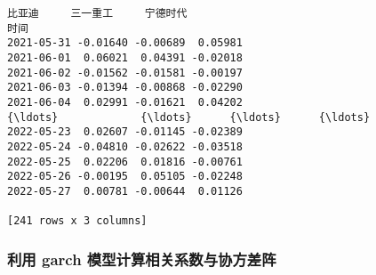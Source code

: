 \documentclass[11pt]{article}
\makeatletter
\newcommand{\boxspacing}{\kern\kvtcb@left@rule\kern\kvtcb@boxsep}
\newcommand{\prompt}[4]{
        {\ttfamily\llap{{\color{#2}[#3]:\hspace{3pt}#4}}\vspace{-\baselineskip}}
    }
\makeatother
\begin{document}
            \begin{tcolorbox}[breakable, size=fbox, boxrule=.5pt, pad at break*=1mm, opacityfill=0]
\prompt{Out}{outcolor}{2}{\boxspacing}
\begin{Verbatim}[commandchars=\\\{\}]
                比亚迪     三一重工     宁德时代
时间
2021-05-31 -0.01640 -0.00689  0.05981
2021-06-01  0.06021  0.04391 -0.02018
2021-06-02 -0.01562 -0.01581 -0.00197
2021-06-03 -0.01394 -0.00868 -0.02290
2021-06-04  0.02991 -0.01621  0.04202
{\ldots}             {\ldots}      {\ldots}      {\ldots}
2022-05-23  0.02607 -0.01145 -0.02389
2022-05-24 -0.04810 -0.02622 -0.03518
2022-05-25  0.02206  0.01816 -0.00761
2022-05-26 -0.00195  0.05105 -0.02248
2022-05-27  0.00781 -0.00644  0.01126

[241 rows x 3 columns]
\end{Verbatim}
\end{tcolorbox}

    \hypertarget{ux5229ux7528-garch-ux6a21ux578bux8ba1ux7b97ux76f8ux5173ux7cfbux6570ux4e0eux534fux65b9ux5deeux9635}{%
\subsubsection{利用 garch
模型计算相关系数与协方差阵}\label{ux5229ux7528-garch-ux6a21ux578bux8ba1ux7b97ux76f8ux5173ux7cfbux6570ux4e0eux534fux65b9ux5deeux9635}}
\end{document}
